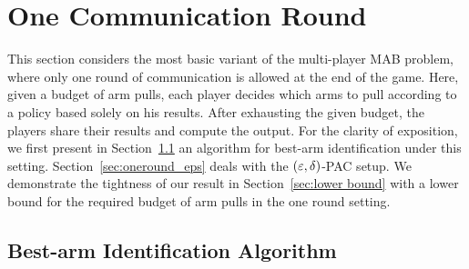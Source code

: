 
\section{One Communication Round}
\label{sec:singleround}



This section considers the most basic variant of the multi-player MAB problem, where only one round of communication is allowed at the end of the game.
Here, given a budget of arm pulls, each player decides which arms to pull according to a policy based solely on his results.
After exhausting the given budget, the players share their results and compute the output.
For the clarity of exposition, we first present in  Section~\ref{sec:best one round} an algorithm for best-arm identification under this setting. 
Section~\ref{sec:oneround_eps} deals with the $(\varepsilon,\delta)$-PAC setup.
We demonstrate the tightness of our result in Section~\ref{sec:lower bound} with a lower bound for the required budget of arm pulls in the one round setting.  


\subsection{Best-arm Identification Algorithm} \label{sec:best one round}

